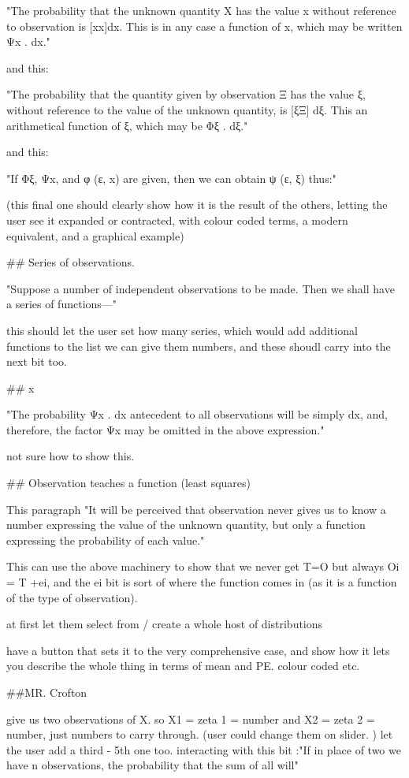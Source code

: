 "The probability that the unknown quantity X has the value x without reference to observation is [xx]dx. This is in any case a function of x, which may be written Ψx . dx."

and this:

"The probability that the quantity given by observation Ξ has the value ξ, without reference to the value of the unknown quantity, is [ξΞ] dξ. This an arithmetical function of ξ, which may be Φξ . dξ."

and this:

"If Φξ, Ψx, and φ (ε, x) are given, then we can obtain ψ (ε, ξ) thus:"

(this final one should clearly show how it is the result of the others, letting the user see it expanded or contracted, with colour coded terms, a modern equivalent, and a graphical example)

## Series of observations. 

"Suppose a number of independent observations to be made. Then we shall have a series of functions—"

this should let the user set how many series, which would add additional functions to the list we can give them numbers, and these shoudl carry into the next bit too. 

## x

"The probability Ψx . dx antecedent to all observations will be simply dx, and, therefore, the factor Ψx may be omitted in the above expression."

not sure how to show this. 


## Observation teaches a function (least squares)

This paragraph "It will be perceived that observation never gives us to know a number expressing the value of the unknown quantity, but only a function expressing the probability of each value."

This can use the above machinery to show that we never get T=O but always Oi = T +ei, and the ei bit is sort of where the function comes in (as it is a function of the type of observation).

at first let them select from  / create a whole host of distributions

have a button that sets it to the very comprehensive case, and show how it lets you describe the whole thing in terms of mean and PE. colour coded etc. 


##MR. Crofton

give us two observations of X. so X1 = zeta 1 = number and X2 = zeta 2 = number, just numbers to carry through. (user could change them on slider. ) let the user add a third - 5th one too. interacting with this bit :"If in place of two we have n observations, the probability that the sum of all will"

